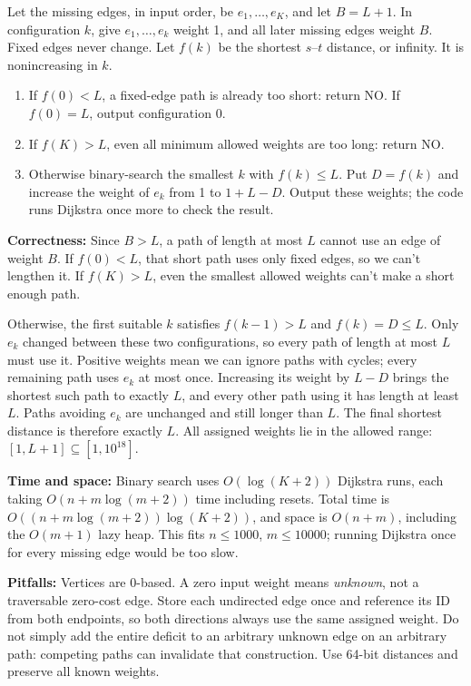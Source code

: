 \documentclass[11pt]{article}
\newcommand{\correct}[1]{\par\textbf{Correctness:} #1}
\newcommand{\bounds}[1]{\par\textbf{Time and space:} #1}
\newcommand{\pitfalls}[1]{\par\textbf{Pitfalls:} #1}
\begin{document}
Let the missing edges, in input order, be $e_1,\ldots,e_K$, and let $B=L+1$. In configuration $k$, give $e_1,\ldots,e_k$ weight 1, and all later missing edges weight $B$. Fixed edges never change. Let $f(k)$ be the shortest $s$--$t$ distance, or infinity. It is nonincreasing in $k$.
\begin{enumerate}[nosep]
\item If $f(0)<L$, a fixed-edge path is already too short: return NO. If $f(0)=L$, output configuration 0.
\item If $f(K)>L$, even all minimum allowed weights are too long: return NO.
\item Otherwise binary-search the smallest $k$ with $f(k)\leq L$. Put $D=f(k)$ and increase the weight of $e_k$ from 1 to $1+L-D$. Output these weights; the code runs Dijkstra once more to check the result.
\end{enumerate}
\correct{Since $B>L$, a path of length at most $L$ cannot use an edge of weight $B$. If $f(0)<L$, that short path uses only fixed edges, so we can't lengthen it. If $f(K)>L$, even the smallest allowed weights can't make a short enough path.

Otherwise, the first suitable $k$ satisfies $f(k-1)>L$ and $f(k)=D\leq L$. Only $e_k$ changed between these two configurations, so every path of length at most $L$ must use it. Positive weights mean we can ignore paths with cycles; every remaining path uses $e_k$ at most once. Increasing its weight by $L-D$ brings the shortest such path to exactly $L$, and every other path using it has length at least $L$. Paths avoiding $e_k$ are unchanged and still longer than $L$. The final shortest distance is therefore exactly $L$. All assigned weights lie in the allowed range: $[1,L+1]\subseteq[1,10^{18}]$.}
\bounds{Binary search uses $O(\log(K+2))$ Dijkstra runs, each taking $O(n+m\log(m+2))$ time including resets. Total time is $O((n+m\log(m+2))\log(K+2))$, and space is $O(n+m)$, including the $O(m+1)$ lazy heap. This fits $n\leq1000$, $m\leq10000$; running Dijkstra once for every missing edge would be too slow.}
\pitfalls{Vertices are 0-based. A zero input weight means \emph{unknown}, not a traversable zero-cost edge. Store each undirected edge once and reference its ID from both endpoints, so both directions always use the same assigned weight. Do not simply add the entire deficit to an arbitrary unknown edge on an arbitrary path: competing paths can invalidate that construction. Use 64-bit distances and preserve all known weights.}
\end{document}
